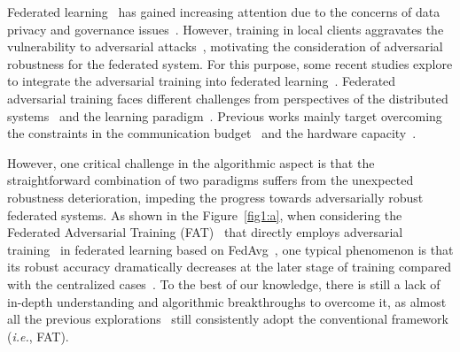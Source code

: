 \documentclass{article} %
\theoremstyle{plain}
\theoremstyle{definition}
\theoremstyle{remark}
\begin{document}
Federated learning~\citep{mcmahan2017communication} has gained increasing attention due to the concerns of data privacy and governance issues~\citep{smith2017federated,li2018federated,kairouz2019advances,lit2020federated,karimireddy2020scaffold,khodak2021federated}. However, training in local clients aggravates the vulnerability to adversarial attacks~\citep{Goodfellow14_Adversarial_examples,kurakin2016adversarial,li2021neural,sanyal2020benign}, motivating the consideration of adversarial robustness for the federated system. For this purpose, some recent studies explore to integrate the adversarial training into federated learning~\citep{kairouz2019advances,zizzo2020fat,shah2021adversarial}. Federated adversarial training faces different challenges from perspectives of the distributed systems~\citep{lit2020federated} and the learning paradigm~\citep{kairouz2019advances}. Previous works mainly target overcoming the constraints in the communication budget~\citep{shah2021adversarial} and the hardware capacity~\citep{hong2021federated}.




However, one critical challenge in the algorithmic aspect is that the straightforward combination of two paradigms suffers from the unexpected robustness deterioration, impeding the progress towards adversarially robust federated systems. As shown in the Figure~\ref{fig1:a}, when considering the Federated Adversarial Training (FAT)~\citep{zizzo2020fat} that directly employs adversarial training~\citep{Madry_adversarial_training} in federated learning based on FedAvg~\citep{mcmahan2017communication}, one typical phenomenon is that its robust accuracy dramatically decreases at the later stage of training compared with the centralized cases~\citep{Madry_adversarial_training}. To the best of our knowledge, there is still a lack of in-depth understanding and algorithmic breakthroughs to overcome it, as almost all the previous explorations~\citep{shah2021adversarial,hong2021federated} still consistently adopt the conventional framework (\textit{i.e.}, FAT).
\end{document}
